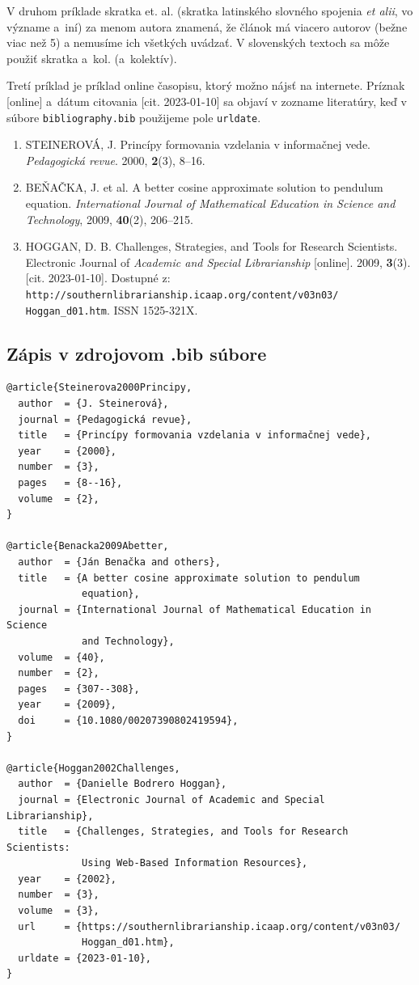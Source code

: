 V druhom príklade skratka et. al. (skratka latinského slovného spojenia \textit{et alii}, vo význame a~iní) za menom autora znamená, že článok má viacero autorov (bežne viac než 5) a nemusíme ich všetkých uvádzať.
V slovenských textoch sa môže použiť skratka a~kol. (a~kolektív).

Tretí príklad je príklad online časopisu, ktorý možno nájsť na internete. Príznak [online] a~dátum citovania [cit. 2023-01-10] sa objaví v zozname literatúry, keď v súbore \verb|bibliography.bib| použijeme pole \verb|urldate|.

\begin{enumerate}
\item STEINEROVÁ, J. Princípy formovania vzdelania v informačnej vede. \textit{Pedagogická revue}. 2000, \textbf{2}(3), 8–16.
\item BEŇAČKA, J. et al. A better cosine approximate solution to pendulum equation. \textit{International Journal of Mathematical Education in Science and Technology}, 2009, \textbf{40}(2), 206–215.
\item HOGGAN, D. B. Challenges, Strategies, and Tools for Research Scientists. Electronic Journal of \textit{Academic and Special Librarianship} [online]. 2009, \textbf{3}(3). [cit. 2023-01-10]. Dostupné z: \texttt{http://southernlibrarianship.icaap.org/content/v03n03/ Hoggan\_d01.htm}. ISSN 1525-321X.
\end{enumerate}

\subsection*{\normalsize Zápis v zdrojovom .bib súbore}
\begin{verbatim}
@article{Steinerova2000Principy,
  author  = {J. Steinerová},
  journal = {Pedagogická revue},
  title   = {Princípy formovania vzdelania v informačnej vede},
  year    = {2000},
  number  = {3},
  pages   = {8--16},
  volume  = {2},
}

@article{Benacka2009Abetter,
  author  = {Ján Benačka and others},
  title   = {A better cosine approximate solution to pendulum
             equation},
  journal = {International Journal of Mathematical Education in Science
             and Technology},
  volume  = {40},
  number  = {2},
  pages   = {307--308},
  year    = {2009},
  doi     = {10.1080/00207390802419594},
}

@article{Hoggan2002Challenges,
  author  = {Danielle Bodrero Hoggan},
  journal = {Electronic Journal of Academic and Special Librarianship},
  title   = {Challenges, Strategies, and Tools for Research Scientists:
             Using Web-Based Information Resources},
  year    = {2002},
  number  = {3},
  volume  = {3},
  url     = {https://southernlibrarianship.icaap.org/content/v03n03/
             Hoggan_d01.htm},
  urldate = {2023-01-10},
}
\end{verbatim}


